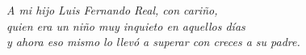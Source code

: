 \thispagestyle{empty}
\vspace*{6.5cm}

\begin{flushright}
\begin{minipage}{0.85\textwidth}
\raggedleft
\itshape\fontsize{11}{17}\selectfont
A mi hijo Luis Fernando Real, con cariño,\\
quien era un niño muy inquieto en aquellos días\\
y ahora eso mismo lo llevó a superar con creces a su padre.
\end{minipage}
\end{flushright}

\vfill
